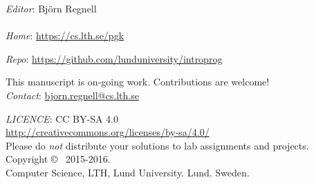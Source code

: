
\clearpage\null\thispagestyle{empty}
\vfill

{
\setlength{\parindent}{0pt}
\emph{Editor}: Björn Regnell \\ 


\\

\emph{Home}: \url{https://cs.lth.se/pgk} \\ \newline

\emph{Repo}: \url{https://github.com/lunduniversity/introprog} \\ \newline


This manuscript is on-going work. Contributions are welcome! \\ 
\emph{Contact}: \url{bjorn.regnell@cs.lth.se}
\\ \newline

\emph{LICENCE}: CC BY-SA 4.0 \\
\url{http://creativecommons.org/licenses/by-sa/4.0/} \\
Please do \emph{not} distribute your solutions to lab assignments and projects. 
\\ \newline
Copyright \copyright~ 2015-2016. \\
Computer Science, LTH, Lund University. Lund. Sweden.\\
}